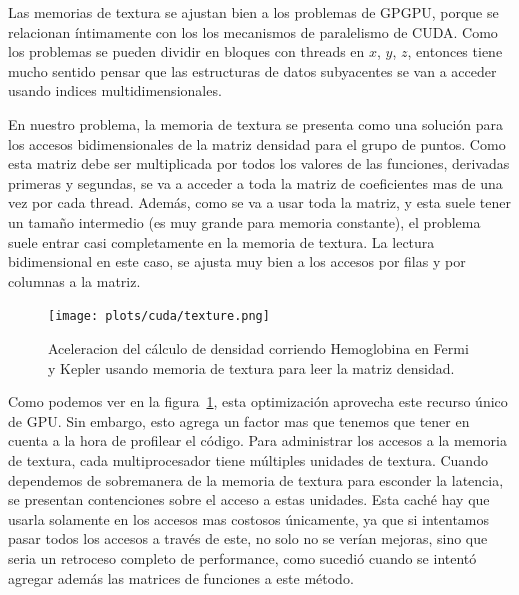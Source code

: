 Las memorias de textura se ajustan bien a los problemas de GPGPU, porque se relacionan
\'intimamente con los los mecanismos de paralelismo de CUDA. Como los problemas se pueden
dividir en bloques con threads en $x$, $y$, $z$, entonces tiene mucho sentido pensar
que las estructuras de datos subyacentes se van a acceder usando indices multidimensionales.

En nuestro problema, la memoria de textura se presenta como una soluci\'on para
los accesos bidimensionales de la matriz densidad para el grupo de puntos.
Como esta matriz debe ser multiplicada por todos los valores de las funciones,
derivadas primeras y segundas, se va a acceder a toda la matriz de coeficientes mas de
una vez por cada thread. Adem\'as, como se va a usar toda la matriz, y esta suele
tener un tama\~no intermedio (es muy grande para memoria constante), el problema
suele entrar casi completamente en la memoria de textura.
La lectura bidimensional en este caso, se ajusta muy bien a los accesos por filas
y por columnas a la matriz.

\begin{figure}[htbp]
   \centering
   \texttt{[image: plots/cuda/texture.png]}
   \caption{Aceleracion del c\'alculo de densidad corriendo Hemoglobina en Fermi y Kepler
   usando memoria de textura para leer la matriz densidad.}
   \label{fig:texture}
\end{figure}

Como podemos ver en la figura~\ref{fig:texture}, esta optimizaci\'on aprovecha este
recurso \'unico de GPU. Sin embargo, esto agrega un factor mas que tenemos que tener en
cuenta a la hora de profilear el c\'odigo. Para administrar los accesos a
la memoria de textura, cada multiprocesador tiene m\'ultiples unidades de textura.
Cuando dependemos de sobremanera de la memoria de textura para esconder la latencia,
se presentan contenciones sobre el acceso a estas unidades. Esta cach\'e hay que usarla
solamente en los accesos mas costosos \'unicamente, ya que si intentamos pasar todos
los accesos a trav\'es de este, no solo no se ver\'ian mejoras, sino que seria un retroceso
completo de performance, como sucedi\'o cuando se intent\'o agregar adem\'as las matrices
de funciones a este m\'etodo.


